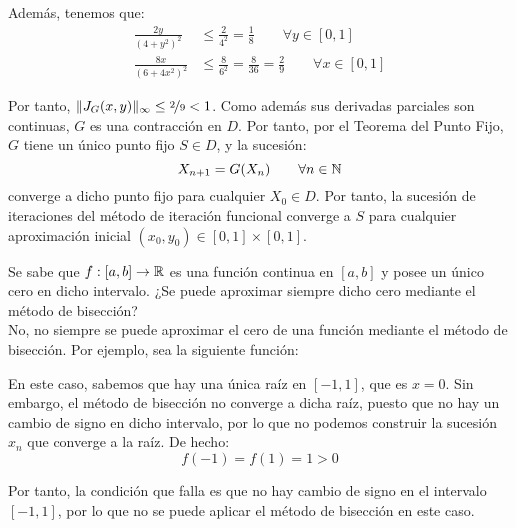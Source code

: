 \begin{ejercicio}
    Además, tenemos que:
    \begin{align*}
        \frac{2y}{(4 + y^2)^2} &\leq \frac{2}{4^2} = \frac{1}{8}\qquad \forall y\in [0, 1]\\
        \frac{8x}{(6 + 4x^2)^2} &\leq \frac{8}{6^2} = \frac{8}{36} = \frac{2}{9}\qquad \forall x\in [0, 1]
    \end{align*}

    Por tanto, $\|J_G(x, y)\|_{\infty}\leq \nicefrac{2}{9}<1$. Como además sus derivadas parciales son continuas, $G$ es una contracción en $D$. Por tanto, por el Teorema del Punto Fijo, $G$ tiene un único punto fijo $S\in D$, y la sucesión:
    \begin{equation*}
        X_{n+1} = G(X_n)\qquad \forall n\in \mathbb{N}
    \end{equation*}
    converge a dicho punto fijo para cualquier $X_0\in D$. Por tanto, la sucesión de iteraciones del método de iteración funcional converge a $S$ para cualquier aproximación inicial $(x_0, y_0)\in [0, 1]\times [0, 1]$.
\end{ejercicio}

\begin{ejercicio}
    Se sabe que $f : [a, b] \to \mathbb{R}$ es una función continua en $[a, b]$ y posee un único cero en dicho intervalo. ¿Se puede aproximar siempre dicho cero mediante el método de bisección?\\

    No, no siempre se puede aproximar el cero de una función mediante el método de bisección. Por ejemplo, sea la siguiente función:

    En este caso, sabemos que hay una única raíz en $[-1,1]$, que es $x=0$. Sin embargo, el método de bisección no converge a dicha raíz, puesto que no hay un cambio de signo en dicho intervalo, por lo que no podemos construir la sucesión $x_n$ que converge a la raíz. De hecho:
    \begin{equation*}
        f(-1) = f(1) = 1 > 0
    \end{equation*}

    Por tanto, la condición que falla es que no hay cambio de signo en el intervalo $[-1,1]$, por lo que no se puede aplicar el método de bisección en este caso.
\end{ejercicio}

